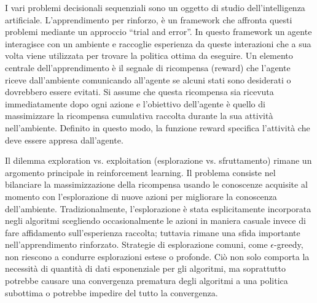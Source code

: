 I vari problemi decisionali sequenziali sono un oggetto di studio dell'intelligenza artificiale. L'apprendimento per rinforzo, è un framework che affronta questi problemi mediante un approccio ``trial and error''. In questo framework un agente interagisce con un ambiente e raccoglie esperienza da queste interazioni che a sua volta viene utilizzata per trovare la politica ottima da eseguire. Un elemento centrale dell'apprendimento è il segnale di ricompensa (reward) che l'agente riceve dall'ambiente comunicando all'agente se alcuni stati sono desiderati o dovrebbero essere evitati. Si assume che questa ricompensa sia ricevuta immediatamente dopo ogni azione e l'obiettivo dell'agente è quello di massimizzare la ricompensa cumulativa raccolta durante la sua attività nell'ambiente. Definito in questo modo, la funzione reward specifica l'attività che deve essere appresa dall'agente. \par
Il dilemma exploration vs. exploitation (esplorazione  vs. sfruttamento) rimane un argomento principale in reinforcement learning. Il problema consiste nel bilanciare la massimizzazione della ricompensa usando le conoscenze acquisite al momento con l'esplorazione di nuove azioni per migliorare la conoscenza dell'ambiente. Tradizionalmente, l'esplorazione è stata esplicitamente incorporata negli algoritmi scegliendo occasionalmente le azioni in maniera casuale invece di fare affidamento sull'esperienza raccolta; tuttavia rimane una sfida importante nell'apprendimento rinforzato. Strategie di esplorazione comuni, come $\epsilon$-greedy, non riescono a condurre esplorazioni estese o profonde. Ciò non solo comporta la necessità di quantità di dati esponenziale per gli algoritmi, ma soprattutto potrebbe causare una convergenza prematura degli algoritmi a una politica subottima o potrebbe impedire del tutto la convergenza. \par
